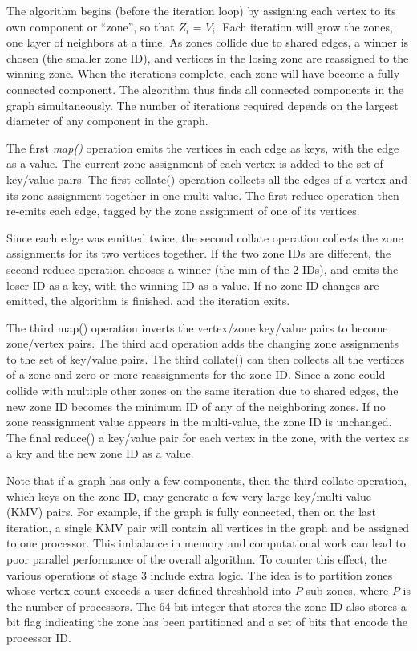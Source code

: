 The algorithm begins (before the iteration loop) by assigning each
vertex to its own component or ``zone'', so that $Z_i$ = $V_i$.  Each
iteration will grow the zones, one layer of neighbors at a time.  As
zones collide due to shared edges, a winner is chosen (the smaller
zone ID), and vertices in the losing zone are reassigned to the
winning zone.  When the iterations complete, each zone will have
become a fully connected component.  The algorithm thus finds all
connected components in the graph simultaneously.  The number of
iterations required depends on the largest diameter of any component
in the graph.

The first {\it map()} operation emits the vertices in each edge as
keys, with the edge as a value.  The current zone assignment of each
vertex is added to the set of key/value pairs.  The first collate()
operation collects all the edges of a vertex and its zone assignment
together in one multi-value.  The first reduce operation then re-emits
each edge, tagged by the zone assignment of one of its vertices.

Since each edge was emitted twice, the second collate operation
collects the zone assignments for its two vertices together.  If the
two zone IDs are different, the second reduce operation chooses a
winner (the min of the 2 IDs), and emits the loser ID as a key, with
the winning ID as a value.  If no zone ID changes are emitted, the
algorithm is finished, and the iteration exits.

The third map() operation inverts the vertex/zone key/value pairs to
become zone/vertex pairs.  The third add operation adds the changing
zone assignments to the set of key/value pairs.  The third collate()
can then collects all the vertices of a zone and zero or more
reassignments for the zone ID.  Since a zone could collide with
multiple other zones on the same iteration due to shared edges, the
new zone ID becomes the minimum ID of any of the neighboring zones.
If no zone reassignment value appears in the multi-value, the zone ID
is unchanged.  The final reduce() a key/value pair for each vertex in
the zone, with the vertex as a key and the new zone ID as a value.

Note that if a graph has only a few components, then the third collate
operation, which keys on the zone ID, may generate a few very large
key/multi-value (KMV) pairs.  For example, if the graph is fully
connected, then on the last iteration, a single KMV pair will contain
all vertices in the graph and be assigned to one processor.  This
imbalance in memory and computational work can lead to poor parallel
performance of the overall algorithm.  To counter this effect, the
various operations of stage 3 include extra logic.  The idea is to
partition zones whose vertex count exceeds a user-defined threshhold
into $P$ sub-zones, where $P$ is the number of processors.  The 64-bit
integer that stores the zone ID also stores a bit flag indicating the
zone has been partitioned and a set of bits that encode the processor
ID.

